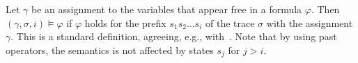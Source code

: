 %
%
%



Let $\gamma$ be an assignment to the variables that appear
free in a formula $\varphi$.
Then $( \gamma ,  \sigma, i ) \models \varphi$
if $\varphi$ holds for the prefix $s_1 s_2 \ldots s_i$ of 
the trace $\sigma$
with the assignment $\gamma$. This is a standard definition,
agreeing, e.g., with~\cite{Basin}. Note that by using past %
operators, the semantics is not affected by
states $s_j$ for $j>i$.
%
\fi

